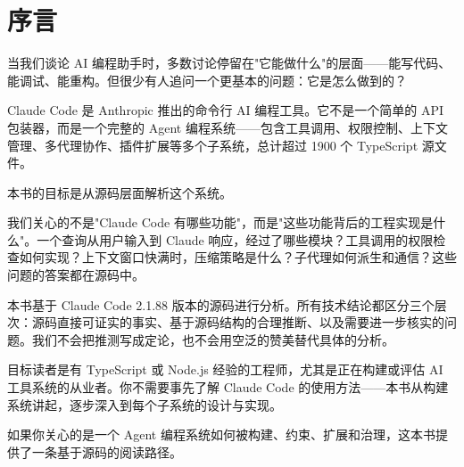 \chapter*{序言}

当我们谈论 AI 编程助手时，多数讨论停留在"它能做什么"的层面——能写代码、能调试、能重构。但很少有人追问一个更基本的问题：它是怎么做到的？

Claude Code 是 Anthropic 推出的命令行 AI 编程工具。它不是一个简单的 API 包装器，而是一个完整的 Agent 编程系统——包含工具调用、权限控制、上下文管理、多代理协作、插件扩展等多个子系统，总计超过 1900 个 TypeScript 源文件。

本书的目标是从源码层面解析这个系统。

我们关心的不是"Claude Code 有哪些功能"，而是"这些功能背后的工程实现是什么"。一个查询从用户输入到 Claude 响应，经过了哪些模块？工具调用的权限检查如何实现？上下文窗口快满时，压缩策略是什么？子代理如何派生和通信？这些问题的答案都在源码中。

本书基于 Claude Code 2.1.88 版本的源码进行分析。所有技术结论都区分三个层次：源码直接可证实的事实、基于源码结构的合理推断、以及需要进一步核实的问题。我们不会把推测写成定论，也不会用空泛的赞美替代具体的分析。

目标读者是有 TypeScript 或 Node.js 经验的工程师，尤其是正在构建或评估 AI 工具系统的从业者。你不需要事先了解 Claude Code 的使用方法——本书从构建系统讲起，逐步深入到每个子系统的设计与实现。

如果你关心的是一个 Agent 编程系统如何被构建、约束、扩展和治理，这本书提供了一条基于源码的阅读路径。
